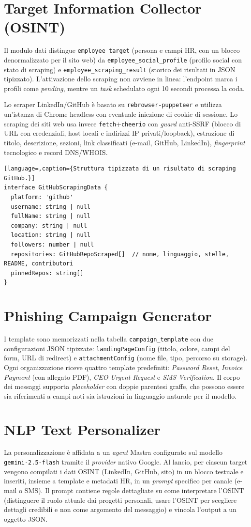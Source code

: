 \documentclass[12pt,a4paper,oneside]{report}
\newcommand{\code}[1]{\texttt{\small #1}}
\begin{document}
\section{Target Information Collector (OSINT)}
Il modulo dati distingue \code{employee\_target} (persona e campi HR, con un blocco
denormalizzato per il sito web) da \code{employee\_social\_profile} (profilo social con
stato di scraping) e \code{employee\_scraping\_result} (storico dei risultati in JSON
tipizzato). L'attivazione dello scraping non avviene in linea: l'endpoint marca i profili
come \emph{pending}, mentre un \emph{task} schedulato ogni 10 secondi processa la coda.

Lo scraper LinkedIn/GitHub \`e basato su \code{rebrowser-puppeteer} e utilizza un'istanza
di Chrome headless con eventuale iniezione di cookie di sessione. Lo scraping dei siti web
usa invece \code{fetch}+\code{cheerio} con \emph{guard} anti-SSRF (blocco di URL con
credenziali, host locali e indirizzi IP privati/loopback), estrazione di titolo,
descrizione, sezioni, link classificati (e-mail, GitHub, LinkedIn), \emph{fingerprint}
tecnologico e record DNS/WHOIS.

\begin{lstlisting}[language=,caption={Struttura tipizzata di un risultato di scraping GitHub.}]
interface GitHubScrapingData {
  platform: 'github'
  username: string | null
  fullName: string | null
  company: string | null
  location: string | null
  followers: number | null
  repositories: GitHubRepoScraped[]  // nome, linguaggio, stelle, README, contributori
  pinnedRepos: string[]
}
\end{lstlisting}

\section{Phishing Campaign Generator}
I template sono memorizzati nella tabella \code{campaign\_template} con due configurazioni
JSON tipizzate: \code{landingPageConfig} (titolo, colore, campi del form, URL di redirect)
e \code{attachmentConfig} (nome file, tipo, percorso su storage). Ogni organizzazione riceve
quattro template predefiniti: \emph{Password Reset}, \emph{Invoice Payment} (con allegato PDF),
\emph{CEO Urgent Request} e \emph{SMS Verification}. Il corpo dei messaggi supporta
\emph{placeholder} con doppie parentesi graffe, che possono essere sia riferimenti a campi
noti sia istruzioni in linguaggio naturale per il modello.

\section{NLP Text Personalizer}
La personalizzazione \`e affidata a un \emph{agent} Mastra configurato sul modello
\code{gemini-2.5-flash} tramite il \emph{provider} nativo Google. Al lancio, per ciascun
target vengono compilati i dati OSINT (LinkedIn, GitHub, sito) in un blocco testuale e
inseriti, insieme a template e metadati HR, in un \emph{prompt} specifico per canale
(e-mail o SMS). Il prompt contiene regole dettagliate su come interpretare l'OSINT
(distinguere il ruolo attuale dai progetti personali, usare l'OSINT per scegliere dettagli
credibili e non come argomento del messaggio) e vincola l'output a un oggetto JSON.
\end{document}
